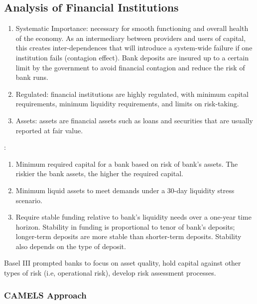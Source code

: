 \subsection{Analysis of Financial Institutions}

\begin{remark} 
\begin{enumerate}[label=\roman*.]
\setlength{\itemsep}{0pt}
\item Systematic Importance: necessary for smooth functioning and overall health of the economy. As an intermediary between providers and users of capital, this creates inter-dependences that will introduce a system-wide failure if one institution fails (contagion effect). Bank deposits are insured up to a certain limit by the government to avoid financial contagion and reduce the risk of bank runs.
\item Regulated: financial institutions are highly regulated, with minimum capital requirements, minimum liquidity requirements, and limits on risk-taking.
\item Assets: assets are financial assets such as loans and securities that are usually reported at fair value.
\end{enumerate}
\end{remark}

\begin{remark} :
\begin{enumerate}[label=\roman*.]
\setlength{\itemsep}{0pt}
\item Minimum required capital for a bank based on risk of bank's assets. The riskier the bank assets, the higher the required capital.
\item Minimum liquid assets to meet demands under a 30-day liquidity stress scenario.
\item Require stable funding relative to bank's liquidity needs over a one-year time horizon. Stability in funding is proportional to tenor of bank's deposits; longer-term deposits are more stable than shorter-term deposits. Stability also depends on the type of deposit.
\end{enumerate}
Basel III prompted banks to focus on asset quality, hold capital against other types of risk (i.e, operational risk), develop risk assessment processes.
\end{remark}

\subsubsection{CAMELS Approach}

